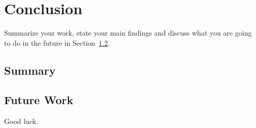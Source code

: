 \chapter{Conclusion}
\label{cha:conc}

Summarize your work, state your main findings and discuss what you are
going to do in the future in Section~\ref{sec:future}.
\section{Summary}
\label{sec:Summary}

\section{Future Work}
\label{sec:future}
Good luck.



